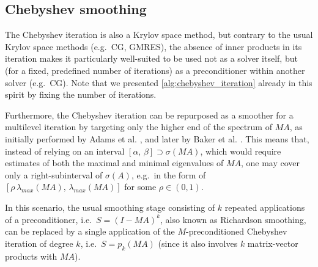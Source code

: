 \documentclass[a4paper]{article}
\theoremstyle{plain}
\theoremstyle{definition}
\theoremstyle{remark}
\begin{document}
\subsection{Chebyshev smoothing}\label{sec:chebyshev_smoothing}

The Chebyshev iteration is also a Krylov space method, but contrary to the usual Krylov space methods (e.g.\ CG, GMRES), the absence of inner products in its iteration makes it particularly well-suited to be used not as a solver itself, but (for a fixed, predefined number of iterations) as a preconditioner within another solver (e.g.\ CG). Note that we presented \cref{alg:chebyshev_iteration} already in this spirit by fixing the number of iterations.

Furthermore, the Chebyshev iteration can be repurposed as a smoother for a multilevel iteration by targeting only the higher end of the spectrum of \(MA\), as initially performed by Adams et al. \cite{Adams2003}, and later by Baker et al. \cite{Baker2011}. This means that, instead of relying on an interval \([\alpha,\, \beta] \supset \sigma(MA)\), which would require estimates of both the maximal and minimal eigenvalues of \(MA\), one may cover only a right-subinterval of \(\sigma(A)\), e.g.\ in the form of \([\rho \, \lambda_{max}(MA), \, \lambda_{max}(MA)]\) for some \(\rho \in (0,1)\).

In this scenario, the usual smoothing stage consisting of \(k\) repeated applications of a preconditioner, i.e.\ \(S = (I - MA)^k\), also known as Richardson smoothing, can be replaced by a single application of the \(M\)-preconditioned Chebyshev iteration of degree \(k\), i.e.\ \(S = p_k(MA)\) (since it also involves \(k\) matrix-vector products with \(MA\)).
\end{document}
